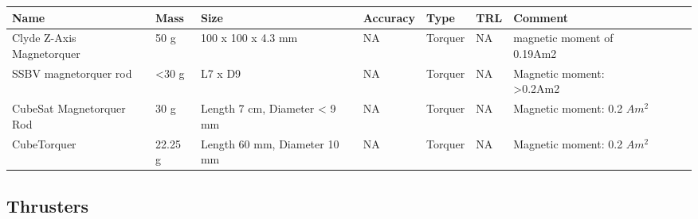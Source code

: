 \begin{center}
     \begin{tabular}{ |p{2cm} | p{1cm} | p{2cm} |  p{2cm} | l | p{2cm} | l | p{4cm} | p{1cm} | p{2cm} |  }
     \hline

      {\bf Name} & {\bf Mass} & {\bf Size} & {\bf Accuracy} & {\bf Type} & {\bf TRL} & {\bf Comment}  \\ \hline
      
       Clyde Z-Axis Magnetorquer & 50 g & 100 x 100 x 4.3 mm & NA & Torquer & NA & magnetic moment of 0.19Am2 \\ \hline
       
	   SSBV magnetorquer rod & <30 g & L7 x D9 & NA & Torquer & NA & Magnetic moment: >0.2Am2 \\ \hline
	   
	   CubeSat Magnetorquer Rod \cite{CubeShop} & 30 g & Length 7 cm, Diameter < 9 mm & NA & Torquer & NA & Magnetic moment: 0.2 $Am^2$ \\ \hline
	   
	   CubeTorquer \cite{CubeShop} & 22.25 g & Length 60 mm, Diameter 10 mm & NA & Torquer & NA & Magnetic moment: 0.2 $Am^2$ \\ \hline	 
     \end{tabular}
\end{center}

\subsection{Thrusters}

